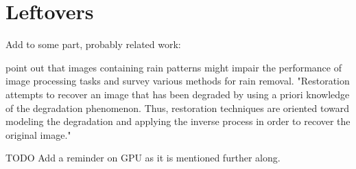\section{Leftovers}
Add to some part, probably related work:  
  
\cite{wang2019survey} point out that images containing rain patterns  might  impair  the  performance of image processing tasks and survey various methods for rain removal.  
\cite{gonzalez2018} "Restoration attempts to recover an image that has been degraded by using a priori knowledge of the degradation phenomenon. Thus, restoration techniques are oriented toward modeling the degradation and applying the inverse process in order to recover the original image."

TODO Add a reminder on GPU as it is mentioned further along.